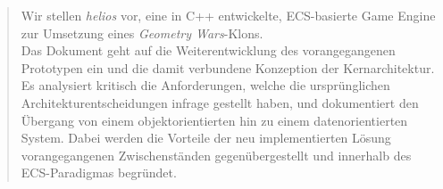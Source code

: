 \begin{abstract}
    Wir stellen \textit{helios} vor, eine in C++ entwickelte, ECS-basierte Game Engine zur Umsetzung eines \textit{Geometry Wars}-Klons.\\
    Das Dokument geht auf die Weiterentwicklung des vorangegangenen Prototypen ein und die damit verbundene Konzeption der Kernarchitektur.
    Es analysiert kritisch die Anforderungen, welche die ursprünglichen Architekturentscheidungen infrage gestellt haben, und dokumentiert den Übergang von einem objektorientierten hin zu einem datenorientierten System.
    Dabei werden die Vorteile der neu implementierten Lösung vorangegangenen Zwischenständen gegenübergestellt und innerhalb des ECS-Paradigmas begründet.
\end{abstract}



